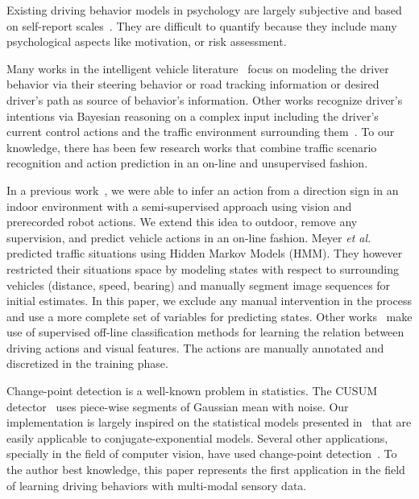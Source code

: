 Existing driving behavior models in psychology are largely subjective and based
on self-report scales~\cite{ranney94models}. They are difficult to quantify
because they include many psychological aspects like motivation, or risk
assessment.

Many works in the intelligent vehicle
literature~\cite{donges78two,mcruer80human,hess90control,macadam81application}
focus on modeling the driver behavior via their steering behavior or road
tracking information or desired driver's path as source of behavior's
information. Other works recognize driver's intentions via Bayesian reasoning on
a complex input including the driver's current control actions and the traffic
environment surrounding them~\cite{oliver00graphical,liu01modeling}. To our
knowledge, there has been few research works that combine traffic scenario
recognition and action prediction in an on-line and unsupervised fashion.

In a previous work~\cite{maye10inferring}, we were able to infer an action from
a direction sign in an indoor environment with a semi-supervised approach
using vision and prerecorded robot actions. We extend this idea to outdoor,
remove any supervision, and predict vehicle actions in an on-line fashion.
Meyer \emph{et al.}~\cite{meyer09probabilistic} predicted traffic situations
using Hidden Markov Models (HMM). They however restricted their situations space
by modeling states with respect to surrounding vehicles (distance, speed,
bearing) and manually segment image sequences for initial estimates. In this
paper, we exclude any manual intervention in the process and use a more complete
set of variables for predicting states. Other
works~\cite{heracles10vision,pugeault10learning} make use of supervised
off-line classification methods for learning the relation between driving
actions and  visual features. The actions are manually annotated and discretized
in the training phase.

Change-point detection is a well-known problem in statistics. The CUSUM
detector~\cite{page54continuous} uses piece-wise segments of Gaussian mean with
noise. Our implementation is largely inspired on the statistical models
presented in~\cite{adams07bayesian,fearnhead07online} that are easily applicable
to conjugate-exponential models. Several other applications, specially in the
field of computer vision, have used change-point
detection~\cite{zhai05general,cemgil05hybrid}. To the author best knowledge,
this paper represents the first application in the field of learning driving
behaviors with multi-modal sensory data.
